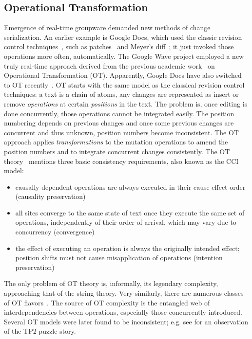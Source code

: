 \documentclass{sig-alternate}
\newenvironment{tightitem}{
\begin{itemize}
  \setlength{\itemsep}{1pt}
  \setlength{\parskip}{0pt}
  \setlength{\parsep}{0pt}}{\end{itemize}
}
\begin{document}
\subsection{Operational Transformation}
Emergence of real-time groupware demanded new methods of change serialization.
An earlier example is Google Docs, which used the classic revision control techniques~\cite{diff-match-patch}, such as patches~\cite{patch} and Meyer's diff~\cite{meyers-diff}; it just invoked those operations more often, automatically.
The Google Wave project employed a new truly real-time approach derived from the previous academic work~\cite{jupiter} on Operational Transformation (OT).
Apparently, Google Docs have also switched to OT recently~\cite{own-experience}.
OT starts with the same model as the classical revision control techniques: a text is a chain of atoms, any changes are represented as insert or remove \emph{operations} at certain \emph{positions} in the text.
The problem is, once editing is done concurrently, those operations cannot be integrated easily.
The position numbering depends on previous changes and once some previous changes are concurrent and thus unknown, position numbers become inconsistent.
The OT approach applies \emph{transformations} to the mutation operations to amend the position numbers and to integrate concurrent changes consistently. The OT theory~\cite{sun-achieving} mentions three basic consistency requirements, also known as the CCI model: 
\begin{tightitem}
\item causally dependent operations are always executed in their cause-effect order (causality preservation)
\item all sites converge to the same state of text once they execute the same set of operations, independently of their order of arrival, which may vary due to concurrency (convergence)
\item the effect of executing an operation is always the originally intended effect; position shifts must not cause misapplication of operations (intention preservation)
\end{tightitem}
The only problem of OT theory is, informally, its legendary complexity, approaching that of the string theory.
Very similarly, there are numerous classes of OT flavors~\cite{ot}.
The source of OT complexity is the entangled web of interdependencies between operations, especially those concurrently introduced.
Several OT models were later found to be inconsistent; e.g. see \cite{molli-proving, woot} for an observation of the TP2 puzzle story.
\end{document}
